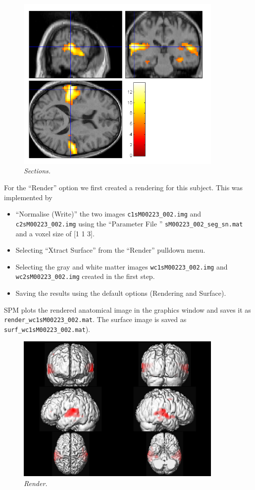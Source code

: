\begin{figure}
\begin{center}
\includegraphics[width=100mm]{auditory/sections}
\caption{\emph{Sections.} \label{aud_sections} }
\end{center}
\end{figure}

For the ``Render'' option we first created a rendering for this subject. This was implemented by 

\begin{itemize}
\item ``Normalise (Write)'' the two images \texttt{c1sM00223\_002.img} and \texttt{c2sM00223\_002.img} using the ``Parameter File '' \texttt{sM00223\_002\_seg\_sn.mat} and a voxel size of [1 1 3].
\item Selecting ``Xtract Surface'' from the ``Render'' pulldown menu.
\item Selecting the gray and white matter images \texttt{wc1sM00223\_002.img} and \texttt{wc2sM00223\_002.img} created in the first step.
\item Saving the results using the default options (Rendering and Surface).
\end{itemize}

SPM plots the rendered anatomical image in the graphics window and saves it as \texttt{render\_\-wc1sM00223\_\-002.mat}. The surface image is saved as \texttt{surf\_wc1sM00223\_002.mat}).

\begin{figure}
\begin{center}
\includegraphics[width=100mm]{auditory/render}
\caption{\emph{Render.} \label{aud_render} }
\end{center}
\end{figure}

